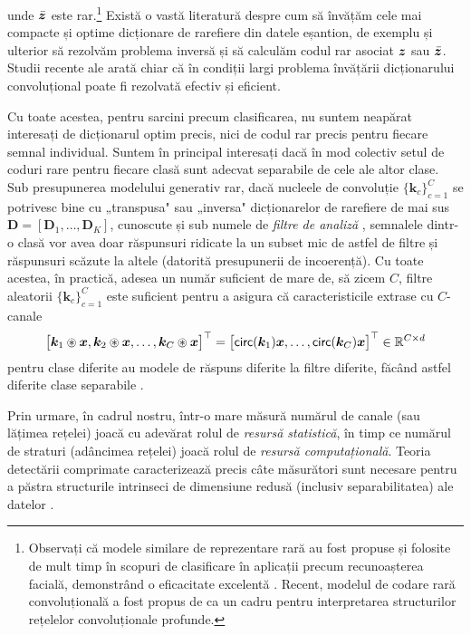 \documentclass[../../book-main_ro.tex]{subfiles}
\begin{document}
unde $\bar {\bm{z}}$ este rar.\footnote{Observați că modele similare de reprezentare rară au fost propuse și folosite de mult timp în scopuri de clasificare în aplicații precum recunoașterea facială, demonstrând o eficacitate excelentă \cite{Wright:2009,wagner2012toward}. Recent, modelul de codare rară convoluțională a fost propus de \cite{papyan2017convolutional} ca un cadru pentru interpretarea structurilor rețelelor convoluționale profunde.} Există o vastă literatură despre cum să învățăm cele mai compacte și optime dicționare de rarefiere din datele eșantion, de exemplu \cite{li2019multichannel,qu2019nonconvex} și ulterior să rezolvăm problema inversă și să calculăm codul rar asociat $\bm{z}$ sau $\bar {\bm{z}}$. Studii recente ale \cite{qu2020nonconvex,Qu2020Geometric} arată chiar că în condiții largi problema învățării dicționarului convoluțional poate fi rezolvată efectiv și eficient. 

Cu toate acestea, pentru sarcini precum clasificarea, nu suntem neapărat interesați de dicționarul optim precis, nici de codul rar precis pentru fiecare semnal individual. Suntem în principal interesați dacă în mod colectiv setul de coduri rare pentru fiecare clasă sunt adecvat separabile de cele ale altor clase. Sub presupunerea modelului generativ rar, dacă nucleele de convoluție $\{\bm k_c\}_{c=1}^C$ se potrivesc bine cu „transpusa" sau „inversa" dicționarelor de rarefiere de mai sus $\bm D = [\bm D_1, \ldots, \bm D_K]$, cunoscute și sub numele de {\em filtre de analiză} \cite{Cosparse-Nam,Analysis-Filter}, semnalele dintr-o clasă vor avea doar răspunsuri ridicate la un subset mic de astfel de filtre și răspunsuri scăzute la altele (datorită presupunerii de incoerență). Cu toate acestea, în practică, adesea un număr suficient de mare de, să zicem $C$, filtre aleatorii $\{\bm k_c\}_{c=1}^C$ este suficient pentru a asigura că caracteristicile extrase cu $C$-canale
\begin{equation}
\big[\bm k_1 \circledast \bm{x}, \bm k_2 \circledast \bm{x}, \ldots, \bm k_C \circledast \bm{x}\big]^\top = \big[\mathsf{circ}(\bm k_1) \bm{x}, \ldots, \mathsf{circ}(\bm k_C) \bm{x} \big]^\top \in \mathbb{R}^{C\times d}
\end{equation}
pentru clase diferite au modele de răspuns diferite la filtre diferite, făcând astfel diferite clase separabile \cite{chan2015pcanet}. 

Prin urmare, în cadrul nostru, într-o mare măsură numărul de canale (sau lățimea rețelei) joacă cu adevărat rolul de {\em resursă statistică}, în timp ce numărul de straturi (adâncimea rețelei) joacă rolul de {\em resursă computațională}. Teoria detectării comprimate caracterizează precis câte măsurători sunt necesare pentru a păstra structurile intrinseci de dimensiune redusă (inclusiv separabilitatea) ale datelor \cite{Wright-Ma-2021}.
\end{document}
